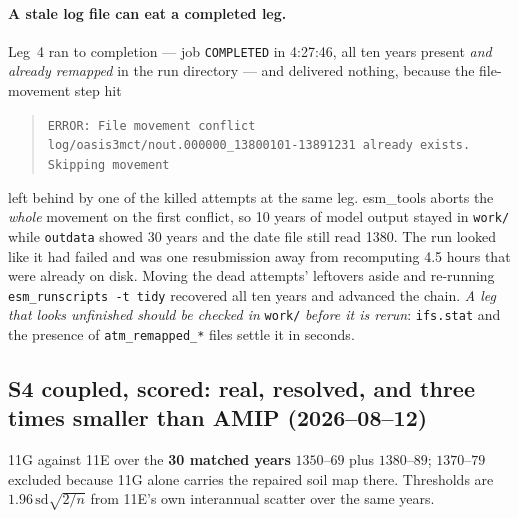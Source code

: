 \documentclass[10pt]{article}
\begin{document}
\paragraph{A stale log file can eat a completed leg.} Leg~4 ran to completion --- job
\texttt{COMPLETED} in 4:27:46, all ten years present \emph{and already remapped} in the
run directory --- and delivered nothing, because the file-movement step hit
\begin{quote}\footnotesize
\texttt{ERROR: File movement conflict}\\
\texttt{log/oasis3mct/nout.000000\_13800101-13891231 already exists. Skipping movement}
\end{quote}
left behind by one of the killed attempts at the same leg. esm\_tools aborts the
\emph{whole} movement on the first conflict, so 10 years of model output stayed in
\texttt{work/} while \texttt{outdata} showed 30 years and the date file still read 1380.
The run looked like it had failed and was one resubmission away from recomputing 4.5
hours that were already on disk. Moving the dead attempts' leftovers aside and re-running
\texttt{esm\_runscripts -t tidy} recovered all ten years and advanced the chain. \emph{A
leg that looks unfinished should be checked in} \texttt{work/} \emph{before it is
rerun}: \texttt{ifs.stat} and the presence of \texttt{atm\_remapped\_*} files settle it in
seconds.

\subsection{S4 coupled, scored: real, resolved, and three times smaller than AMIP
(2026--08--12)}\label{sub:r28gscore}
11G against 11E over the \textbf{30 matched years} $1350$--$69$ plus $1380$--$89$;
$1370$--$79$ excluded because 11G alone carries the repaired soil map there. Thresholds
are $1.96\,\mathrm{sd}\sqrt{2/n}$ from 11E's own interannual scatter over the same years.
\end{document}
